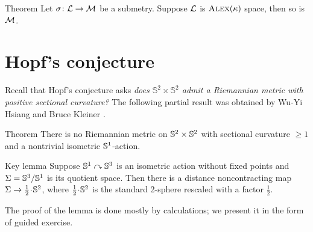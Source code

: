 \begin{thm}{Theorem}\label{thm:submetry-CBB-1}
Let $\sigma\colon\mathcal{L}\to\mathcal{M}$ be a submetry.
Suppose $\mathcal{L}$ is $\textsc{Alex}(\kappa)$ space, then so is $\mathcal{M}$.
\end{thm}

\section{Hopf's conjecture}

Recall that Hopf's conjecture asks \textit{does $\mathbb{S}^2\times\mathbb{S}^2$ admit a Riemannian metric with positive sectional curvature?}
The following partial result was obtained by Wu-Yi Hsiang and Bruce Kleiner \cite{hsiang-kleiner}.

\begin{thm}{Theorem}\label{thm:hsiang-kleiner}
There is no Riemannian metric on $\mathbb{S}^2\times\mathbb{S}^2$ with sectional curvature $\ge 1$ and a nontrivial isometric $\mathbb{S}^1$-action.
\end{thm}


\begin{thm}{Key lemma}\label{lem:S^3/S^1}
Suppose $\mathbb{S}^1\curvearrowright\mathbb{S}^3$ is an isometric action without fixed points 
and $\Sigma=\mathbb{S}^3/\mathbb{S}^1$ is its quotient space.
Then there is a distance noncontracting map $\Sigma\to \tfrac12\cdot \SSS^2$, where $\tfrac12\cdot \SSS^2$ is the standard 2-sphere rescaled with a factor $\tfrac12$.
\end{thm}

The proof of the lemma is done mostly by calculations;
we present it in the form of guided exercise.

